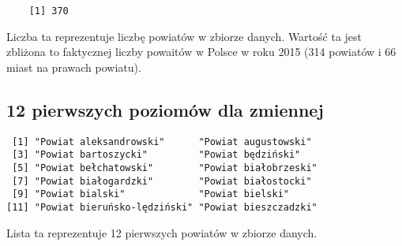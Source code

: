 \begin{verbatim}
    [1] 370
\end{verbatim}

Liczba ta reprezentuje liczbę powiatów w zbiorze danych.
Wartość ta jest zbliżona to faktycznej liczby powaitów w Polsce w roku 2015
(314 powiatów i 66 miast na prawach powiatu).

\subsection*{12 pierwszych poziomów dla zmiennej }

\begin{verbatim}
 [1] "Powiat aleksandrowski"      "Powiat augustowski"        
 [3] "Powiat bartoszycki"         "Powiat będziński"          
 [5] "Powiat bełchatowski"        "Powiat białobrzeski"       
 [7] "Powiat białogardzki"        "Powiat białostocki"        
 [9] "Powiat bialski"             "Powiat bielski"            
[11] "Powiat bieruńsko-lędziński" "Powiat bieszczadzki"
\end{verbatim}

Lista ta reprezentuje 12 pierwszych powiatów w zbiorze danych.



